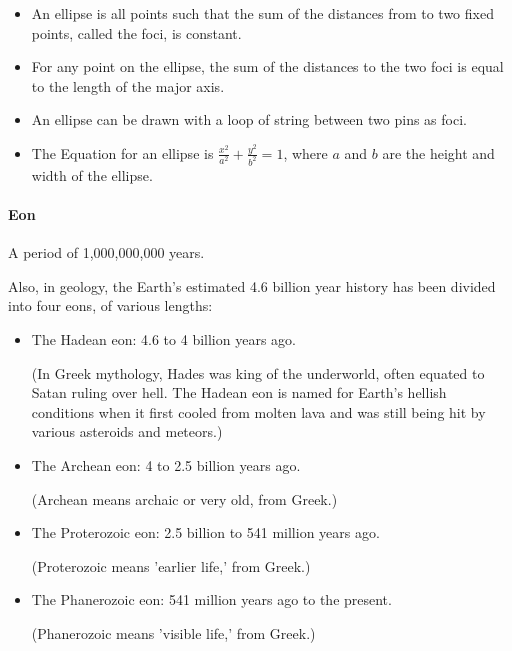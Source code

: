 \documentclass[12pt]{article}
\begin{document}
\begin{itemize}
\item An ellipse is all points such that the sum of the distances from to two fixed points, called the foci, is constant.
\item For any point on the ellipse, the sum of the distances to the two foci is equal to the length of the major axis.
\item An ellipse can be drawn with a loop of string between two pins as foci.

\begin{center}
\end{center}

\item The Equation for an ellipse is $\frac{x^2}{a^2} + \frac{y^2}{b^2} = 1$,
where \( a \) and \( b \) are the height and width of the ellipse.
\end{itemize}

\paragraph{Eon}
A period of 1,000,000,000 years.

Also, in geology, the Earth's estimated 4.6 billion year history has been divided into four eons, of various lengths:

\begin{itemize}
\item The Hadean eon: 4.6 to 4 billion years ago.
    
(In Greek mythology, Hades was king of the underworld, often equated to Satan ruling over hell. The Hadean eon is named for Earth's hellish conditions when it first cooled from molten lava and was still being hit by various asteroids and meteors.)

\item The Archean eon: 4 to 2.5 billion years ago.

(Archean means archaic or very old, from Greek.)

\item The Proterozoic eon: 2.5 billion to 541 million years ago.

(Proterozoic means 'earlier life,' from Greek.)

\item The Phanerozoic eon: 541 million years ago to the present.

(Phanerozoic means 'visible life,' from Greek.)
\end{itemize}
\end{document}
